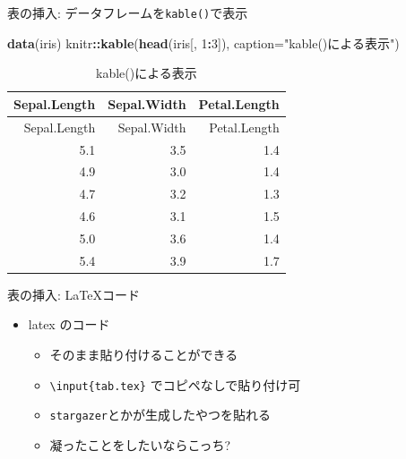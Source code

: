 \documentclass[
  12pt,
  ignorenonframetext,
]{beamer}
\newenvironment{Shaded}{\begin{snugshade}}{\end{snugshade}}
\newcommand{\DataTypeTok}[1]{\textcolor[rgb]{0.13,0.29,0.53}{#1}}
\newcommand{\DecValTok}[1]{\textcolor[rgb]{0.00,0.00,0.81}{#1}}
\newcommand{\KeywordTok}[1]{\textcolor[rgb]{0.13,0.29,0.53}{\textbf{#1}}}
\newcommand{\NormalTok}[1]{#1}
\newcommand{\OperatorTok}[1]{\textcolor[rgb]{0.81,0.36,0.00}{\textbf{#1}}}
\newcommand{\StringTok}[1]{\textcolor[rgb]{0.31,0.60,0.02}{#1}}
\providecommand{\tightlist}{%
  \setlength{\itemsep}{0pt}\setlength{\parskip}{0pt}}
\begin{document}
\begin{frame}[fragile]{表の挿入: データフレームを\texttt{kable()}で表示}
\protect\hypertarget{ux8868ux306eux633fux5165-ux30c7ux30fcux30bfux30d5ux30ecux30fcux30e0ux3092kableux3067ux8868ux793a}{}

\begin{Shaded}
\begin{Highlighting}[]
\KeywordTok{data}\NormalTok{(iris)}
\NormalTok{knitr}\OperatorTok{::}\KeywordTok{kable}\NormalTok{(}\KeywordTok{head}\NormalTok{(iris[, }\DecValTok{1}\OperatorTok{:}\DecValTok{3}\NormalTok{]),}
             \DataTypeTok{caption=}\StringTok{"kable()による表示"}\NormalTok{)}
\end{Highlighting}
\end{Shaded}

\begin{longtable}[]{@{}rrr@{}}
\caption{kable()による表示}\tabularnewline
\toprule
Sepal.Length & Sepal.Width & Petal.Length\tabularnewline
\midrule
\endfirsthead
\toprule
Sepal.Length & Sepal.Width & Petal.Length\tabularnewline
\midrule
\endhead
5.1 & 3.5 & 1.4\tabularnewline
4.9 & 3.0 & 1.4\tabularnewline
4.7 & 3.2 & 1.3\tabularnewline
4.6 & 3.1 & 1.5\tabularnewline
5.0 & 3.6 & 1.4\tabularnewline
5.4 & 3.9 & 1.7\tabularnewline
\bottomrule
\end{longtable}

\end{frame}

\begin{frame}[fragile]{表の挿入: LaTeXコード}
\protect\hypertarget{ux8868ux306eux633fux5165-latexux30b3ux30fcux30c9}{}

\begin{itemize}
\tightlist
\item
  latex のコード

  \begin{itemize}
  \tightlist
  \item
    そのまま貼り付けることができる
  \item
    \texttt{\textbackslash{}input\{tab.tex\}} でコピペなしで貼り付け可
  \item
    \texttt{stargazer}とかが生成したやつを貼れる
  \item
    凝ったことをしたいならこっち?
  \end{itemize}
\end{itemize}

\begin{Shaded}
\end{Shaded}



\end{frame}
\end{document}
